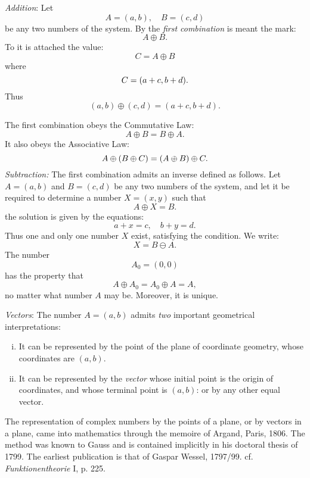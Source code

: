 \emph{Addition}: Let
\[
	A=(a,b), \quad B=(c,d)
\] be any two numbers of the system. By the \emph{first combination} is meant the mark:
\[
A\oplus B
.\] To it is attached the value:
\[
C=A\oplus B
\] where
\[
	C=\pbr*{a+c, b+d} 
.\] Thus
\begin{equation}\label{oplus}
	(a,b)\oplus (c,d)= (a+c, b+d).
\end{equation}

The first combination obeys the Commutative Law:
\[
A\oplus B = B\oplus A
.\] It also obeys the Associative Law:
\[
	A\oplus \pbr*{B\oplus C} =\pbr*{A\oplus B} \oplus C
.\] \emph{Subtraction:} The first combination admits an inverse defined as follows. Let $A=(a,b)$ and $B=(c,d)$ be any two numbers of the system, and let it be required to determine a number $X=(x,y)$ such that
\[
A\oplus X=B
.\] the solution is given by the equations:
\[
a+x=c, \quad b+y=d
.\] Thus one and only one number $X$ exist, satisfying the condition. We write:
\[
X=B\ominus A
.\] The number
 \[
	 A_0=(0,0)
\] has the property that
\[
A\oplus A_0=A_0\oplus A = A
,\] no matter what number $A$ may be. Moreover, it is unique.

\emph{Vectors}: The number $A=(a,b)$ admits \emph{two} important geometrical interpretations:
\begin{enumerate}[i.]
	\item It can be represented by the point of the plane of coordinate geometry, whose coordinates are $(a,b)$.
	\item It can be represented by the \emph{vector} whose initial point is the origin of coordinates, and whose terminal point is $(a,b)$: or by any other equal vector.
\end{enumerate}
The representation of complex numbers by the points of a plane, or by vectors in a plane, came into mathematics through the memoire of Argand, Paris, 1806. The method was known to Gauss and is contained implicitly in his doctoral thesis of 1799. The earliest publication is that of Gaspar Wessel, 1797/99. cf. \emph{Funktionentheorie} I, p. 225.


\begin{figure}[htbp]
	\centering
\end{figure} 

